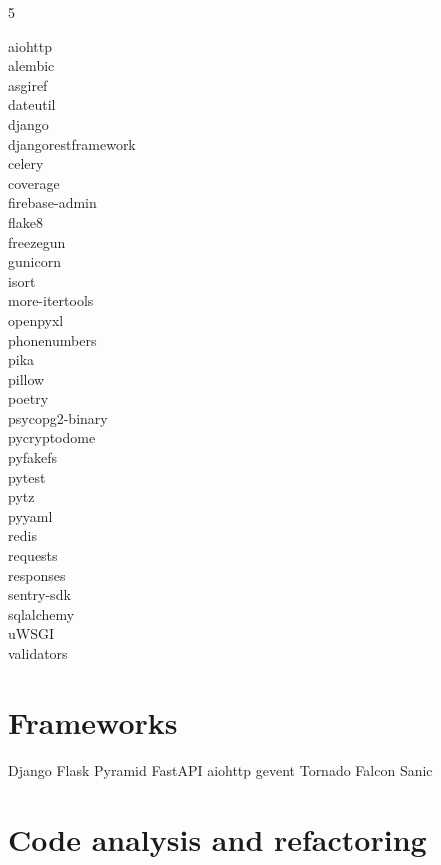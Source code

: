 \documentclass [8pt] {extarticle}
\begin{document}
    \begin {multicols} {5}

    aiohttp \\
    alembic \\
    asgiref \\
    dateutil \\
    django \\
    djangorestframework \\
    celery \\
    coverage \\
    firebase-admin \\
    flake8 \\
    freezegun \\
    gunicorn \\
    isort \\
    more-itertools \\
    openpyxl \\
    phonenumbers \\
    pika \\
    pillow \\
    poetry \\
    psycopg2-binary \\
    pycryptodome \\
    pyfakefs \\
    pytest \\
    pytz \\
    pyyaml \\
    redis \\
    requests \\
    responses \\
    sentry-sdk \\
    sqlalchemy \\
    uWSGI \\
    validators \\

    \end {multicols}

    \section {Frameworks}

    Django \quad
    Flask \quad
    Pyramid \quad
    FastAPI \quad
    aiohttp \quad
    gevent \quad
    Tornado \quad
    Falcon \quad
    Sanic

    \section {Code analysis and refactoring}
\end{document}
